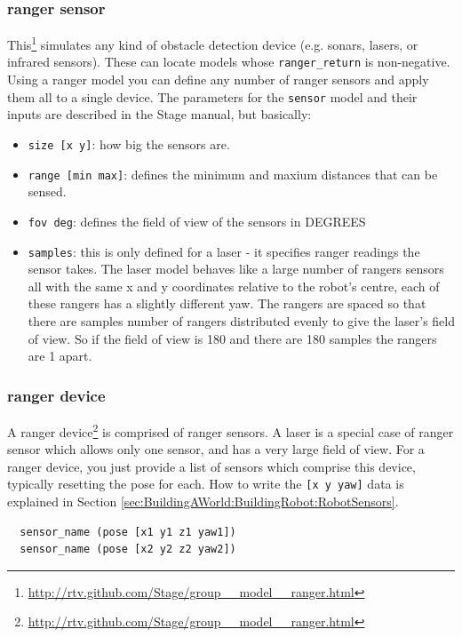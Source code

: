 \documentclass[a4paper]{report}
\begin{document}
\subsubsection{ranger sensor} \label{sec:BuildingAWorld:BuildingRobot:RobotSensors:Ranger Sensor}
This\footnote{\url{http://rtv.github.com/Stage/group__model__ranger.html}}
simulates any kind of obstacle detection device (e.g. sonars, lasers, or
infrared sensors). These can locate models whose {\tt ranger\_return} is
non-negative. Using a ranger model you can define any number of ranger
sensors and apply them all to a single device. The parameters for the
{\tt sensor} model and their inputs are described in the Stage manual, but
basically:
\begin{itemize} 
\item \verb|size [x y]|: how big the sensors are.
\item \verb|range [min max]|: defines the minimum and maxium distances that
can be sensed.
\item \verb|fov deg|: defines the field of view of the sensors in DEGREES
\item \verb|samples|: this is only defined for a laser - it specifies
      ranger readings the sensor takes. The laser model behaves like a
      large number of rangers sensors all with the same x and y coordinates
      relative to the robot's centre, each of these rangers has a slightly
      different yaw. The rangers are spaced so that there are samples
      number of rangers distributed evenly to give the laser's field of
      view. So if the field of view is 180 and there are 180 samples the
      rangers are 1 apart.
\end{itemize}

\subsubsection{ranger device}
A ranger device\footnote{\url{http://rtv.github.com/Stage/group__model__ranger.html}} is comprised of ranger sensors.  A laser is a special case
of ranger sensor which allows only one sensor, and has a very large field
of view.  For a ranger device, you just provide a list of sensors which
comprise this device, typically resetting the pose for each.  How to write
the \verb|[x y yaw]| data is explained in Section
\ref{sec:BuildingAWorld:BuildingRobot:RobotSensors}.
\begin{verbatim}
  sensor_name (pose [x1 y1 z1 yaw1])
  sensor_name (pose [x2 y2 z2 yaw2])
\end{verbatim}
\end{document}
